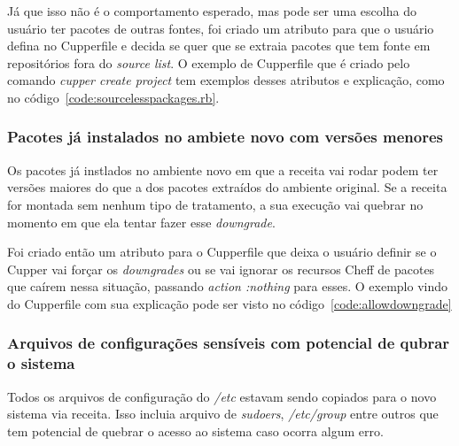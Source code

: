 Já que isso não é o comportamento esperado, mas pode ser uma escolha do usuário
ter pacotes de outras fontes, foi criado um atributo para que o usuário defina no
Cupperfile e decida se quer que se extraia pacotes que tem fonte em repositórios
fora do \textit{source list}. O exemplo de Cupperfile que é criado pelo comando
\textit{cupper create project} tem exemplos desses atributos e explicação, como
no código~\ref{code:sourcelesspackages.rb}.

\noindent\begin{minipage}{0.7\textwidth}
  \lstset{style=shell}
  
\end{minipage}\hfill

\subsubsection{Pacotes já instalados no ambiete novo com versões menores}
Os pacotes já instlados no ambiente novo em que a receita vai rodar podem ter versões
maiores do que a dos pacotes extraídos do ambiente original. Se a receita for
montada sem nenhum tipo de tratamento, a sua execução vai quebrar no momento
em que ela tentar fazer esse \textit{downgrade}.

Foi criado então um atributo para o Cupperfile que deixa o usuário definir
se o Cupper vai forçar os \textit{downgrades} ou se vai ignorar os recursos
Cheff de pacotes que caírem nessa situação, passando \textit{action :nothing}
para esses. O exemplo vindo do Cupperfile com sua explicação pode ser visto no
código~\ref{code:allowdowngrade}

\noindent\begin{minipage}{0.7\textwidth}
  \lstset{style=shell}
  
\end{minipage}\hfill

\subsubsection{Arquivos de configurações sensíveis com potencial de qubrar o sistema}
Todos os arquivos de configuração do \textit{/etc} estavam sendo copiados para
o novo sistema via receita. Isso incluia arquivo de \textit{sudoers}, \textit{/etc/group}
entre outros que tem potencial de quebrar o acesso ao sistema caso ocorra algum erro.

